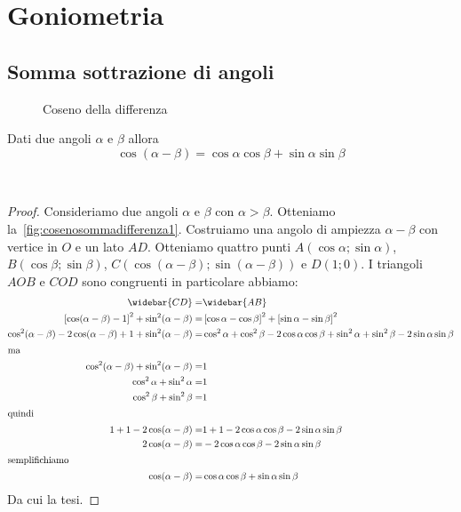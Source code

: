 \chapter{Goniometria}
\section{Somma sottrazione di angoli}
\begin{figure}
	\centering

	\caption{Coseno della differenza}
	\label{fig:cosenosommadifferenza1}
\end{figure}
\begin{thm}\label{thm:Cosenodelladifferenza}
Dati due angoli $\alpha$ e $\beta$ allora
\[\cos(\alpha-\beta)=\cos\alpha\cos\beta+\sin\alpha\sin\beta  \]
\end{thm}~\cite{Ferrauto1979}
\begin{proof}
Consideriamo due angoli $\alpha$ e $\beta$ con $\alpha>\beta$. Otteniamo la~\vref{fig:cosenosommadifferenza1}. Costruiamo una angolo di ampiezza $\alpha-\beta$ con vertice in $O$ e un lato $AD$. Otteniamo quattro punti $A(\cos\alpha;\sin\alpha)$, $B (\cos\beta;\sin\beta)$, $C(\cos\left(\alpha-\beta\right);\sin\left(\alpha-\beta\right))$ e $D(1;0)$. I triangoli $AOB$ e $COD$ sono congruenti in particolare abbiamo: \begin{align*}
\widebar{CD}=&\widebar{AB}\\
\left[\cos(\alpha-\beta)-1\right]^2+\sin^2(\alpha-\beta)=&\left[\cos\alpha-\cos\beta\right]^2+\left[\sin\alpha-\sin\beta\right]^2\\
\cos^2(\alpha-\beta)-2\cos(\alpha-\beta)+1+\sin^2(\alpha-\beta)=&\cos^2\alpha+\cos^2\beta-2\cos\alpha\cos\beta+\sin^2\alpha+\sin^2\beta-2\sin\alpha\sin\beta\\
\intertext{ma}
\cos^2(\alpha-\beta)+\sin^2(\alpha-\beta)=&1\\
\cos^2\alpha+\sin^2\alpha=&1\\
\cos^2\beta+\sin^2\beta=&1\\
\intertext{quindi}
1+1-2\cos(\alpha-\beta)=&1+1-2\cos\alpha\cos\beta-2\sin\alpha\sin\beta\\
2\cos(\alpha-\beta)=&-2\cos\alpha\cos\beta-2\sin\alpha\sin\beta\\
\intertext{semplifichiamo}
\cos(\alpha-\beta)=&\cos\alpha\cos\beta+\sin\alpha\sin\beta 
\end{align*}
Da cui la tesi.
\end{proof}
